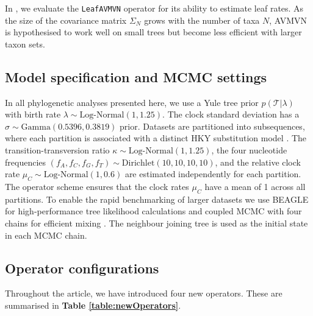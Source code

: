 \documentclass[10pt,letterpaper]{article}
\begin{document}
In , we evaluate the \texttt{LeafAVMVN} operator for its ability to estimate leaf rates. 
As the size of the covariance matrix $\Sigma_N$ grows with the number of taxa $N$, AVMVN is hypothesised to work well on small trees but become less efficient with larger taxon sets.







\clearpage
\subsection*{Model specification and MCMC settings} \label{sect:methods}

In all phylogenetic analyses presented here, we use a Yule \cite{yule1925ii} tree prior $p(\mathcal{T}|\lambda)$ with birth rate $\lambda \sim \text{Log-Normal}(1,1.25)$.
The clock standard deviation has a $\sigma \sim \text{Gamma}(0.5396,0.3819)$ prior.
Datasets are partitioned into subsequences, where each partition is associated with a distinct HKY substitution model \cite{hasegawa1985dating}.
The transition-transversion ratio $\kappa \sim \text{Log-Normal}(1, 1.25)$, the four nucleotide frequencies $(f_A, f_C, f_G, f_T) \sim \text{Dirichlet}(10,10,10,10)$, and the relative clock rate $\mu_C \sim \text{Log-Normal}(1, 0.6)$ are estimated independently for each partition.
The operator scheme ensures that the clock rates $\mu_C$ have a mean of 1 across all partitions. 
To enable the rapid benchmarking of larger datasets we use BEAGLE for high-performance tree likelihood calculations \cite{ayres2012beagle} and coupled MCMC with four chains for efficient mixing \cite{muller2019coupled}.
The neighbour joining tree \cite{saitou1987neighbor} is used as the initial state in each MCMC chain.



\subsection*{Operator configurations} \label{sect:operatorSchemes}


Throughout the article, we have introduced four new operators. 
These are summarised in \textbf{Table \ref{table:newOperators}}.
\end{document}
